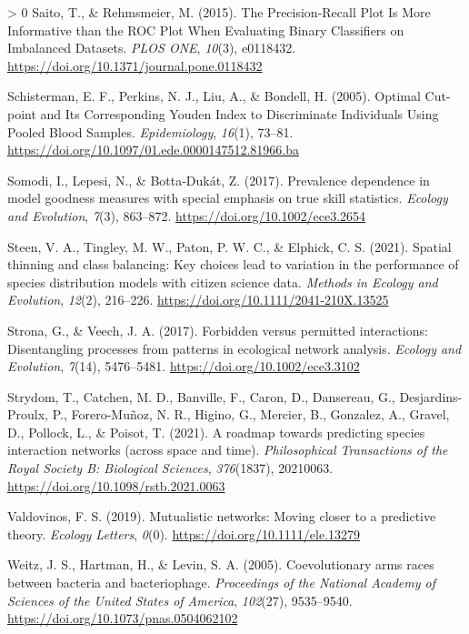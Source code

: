 \documentclass[11pt]{article}
\newlength{\cslhangindent}
\newenvironment{CSLReferences}[3] %
 {%
  \setlength{\parindent}{0pt}
  \ifodd #1 \everypar{\setlength{\hangindent}{\cslhangindent}}\ignorespaces\fi
  \ifnum #2 > 0
  \setlength{\parskip}{#2\baselineskip}
  \fi
 }%
 {}
\begin{document}
\begin{CSLReferences}{1}{0}
\leavevmode\hypertarget{ref-Saito2015PrePlo}{}%
Saito, T., \& Rehmsmeier, M. (2015). The Precision-Recall Plot Is More
Informative than the ROC Plot When Evaluating Binary Classifiers on
Imbalanced Datasets. \emph{PLOS ONE}, \emph{10}(3), e0118432.
\url{https://doi.org/10.1371/journal.pone.0118432}

\leavevmode\hypertarget{ref-Schisterman2005OptCut}{}%
Schisterman, E. F., Perkins, N. J., Liu, A., \& Bondell, H. (2005).
Optimal Cut-point and Its Corresponding Youden Index to Discriminate
Individuals Using Pooled Blood Samples. \emph{Epidemiology},
\emph{16}(1), 73--81.
\url{https://doi.org/10.1097/01.ede.0000147512.81966.ba}

\leavevmode\hypertarget{ref-Somodi2017PreDep}{}%
Somodi, I., Lepesi, N., \& Botta‐Dukát, Z. (2017). Prevalence dependence
in model goodness measures with special emphasis on true skill
statistics. \emph{Ecology and Evolution}, \emph{7}(3), 863--872.
\url{https://doi.org/10.1002/ece3.2654}

\leavevmode\hypertarget{ref-Steen2021SpaThi}{}%
Steen, V. A., Tingley, M. W., Paton, P. W. C., \& Elphick, C. S. (2021).
Spatial thinning and class balancing: Key choices lead to variation in
the performance of species distribution models with citizen science
data. \emph{Methods in Ecology and Evolution}, \emph{12}(2), 216--226.
\url{https://doi.org/10.1111/2041-210X.13525}

\leavevmode\hypertarget{ref-Strona2017ForPer}{}%
Strona, G., \& Veech, J. A. (2017). Forbidden versus permitted
interactions: Disentangling processes from patterns in ecological
network analysis. \emph{Ecology and Evolution}, \emph{7}(14),
5476--5481. \url{https://doi.org/10.1002/ece3.3102}

\leavevmode\hypertarget{ref-Strydom2021RoaPre}{}%
Strydom, T., Catchen, M. D., Banville, F., Caron, D., Dansereau, G.,
Desjardins-Proulx, P., Forero-Muñoz, N. R., Higino, G., Mercier, B.,
Gonzalez, A., Gravel, D., Pollock, L., \& Poisot, T. (2021). A roadmap
towards predicting species interaction networks (across space and time).
\emph{Philosophical Transactions of the Royal Society B: Biological
Sciences}, \emph{376}(1837), 20210063.
\url{https://doi.org/10.1098/rstb.2021.0063}

\leavevmode\hypertarget{ref-Valdovinos2019MutNet}{}%
Valdovinos, F. S. (2019). Mutualistic networks: Moving closer to a
predictive theory. \emph{Ecology Letters}, \emph{0}(0).
\url{https://doi.org/10.1111/ele.13279}

\leavevmode\hypertarget{ref-Weitz2005CoeArm}{}%
Weitz, J. S., Hartman, H., \& Levin, S. A. (2005). Coevolutionary arms
races between bacteria and bacteriophage. \emph{Proceedings of the
National Academy of Sciences of the United States of America},
\emph{102}(27), 9535--9540.
\url{https://doi.org/10.1073/pnas.0504062102}


\end{CSLReferences}
\end{document}
